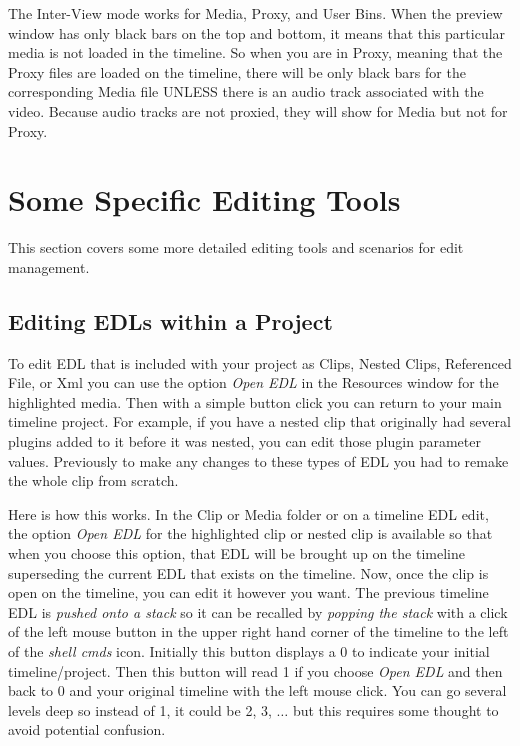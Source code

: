 The Inter-View mode works for Media, Proxy, and User Bins.  When the preview window has only black bars on the top and bottom, it means that this particular media is not loaded in the timeline.  So when you are in Proxy, meaning that the Proxy files are loaded on the timeline, there will be only black bars for the corresponding Media file UNLESS there is an audio track associated with the video.  Because audio tracks are not proxied, they will show for Media but not for Proxy.

\section{Some Specific Editing Tools}%
\label{sec:specific_editing_tools}

This section covers some more detailed editing tools and scenarios for edit management.

\subsection{Editing EDLs within a Project}%
\label{sub:edit-edls}

To edit EDL that is included with your project as Clips, Nested Clips, Referenced File, or Xml you can use the option \textit{Open EDL} in the Resources window for the highlighted media.  Then with a simple button click you can return to your main timeline project.  For example, if you have a nested clip that originally had several plugins added to it before
it was nested, you can edit those plugin parameter values. Previously to make any changes to these types of EDL
you had to remake the whole clip from scratch.

Here is how this works. In the Clip or Media folder or on a timeline EDL edit, the option \textit{Open EDL} for the highlighted clip or nested clip is available so that when you choose this option, that EDL will be brought up on the timeline superseding the current EDL that exists on the timeline.  Now, once the clip is open on the timeline, you can edit it however you want. The previous timeline EDL is \textit{pushed onto a stack} so it can be recalled by \textit{popping the stack} with a click of the left mouse button in the upper right hand corner of the timeline to the left of the \textit{shell cmds} icon.  Initially this button displays a 0 to indicate your initial timeline/project.  Then this button will read 1 if you choose \textit{Open EDL} and then back to 0 and your original timeline with the left mouse click.  You can go several levels deep so instead of 1, it could be 2, 3, $\dots$ but this requires some thought to avoid potential confusion.  
\\

